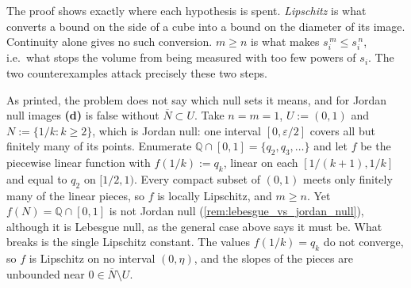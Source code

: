 \begin{exercisesolution}
\begin{ainote}
The proof shows exactly where each hypothesis is spent. \emph{Lipschitz} is what converts a bound
on the side of a cube into a bound on the diameter of its image. Continuity alone gives no
such conversion. \emph{$m \geq n$} is what makes $s_i^{\,m} \leq s_i^{\,n}$, i.e.\ what stops the
volume from being measured with too few powers of $s_i$. The two counterexamples attack precisely
these two steps.
\end{ainote}

\begin{ainote}
As printed, the problem does not say which null sets it means, and for Jordan null images
\textbf{(d)} is false without $\overline N \subset U$. Take $n = m = 1$, $U := (0,1)$ and
$N := \{1/k : k \geq 2\}$, which is Jordan null: one interval $[0,\varepsilon/2]$ covers all but
finitely many of its points. Enumerate $\mathbb{Q}\cap[0,1] = \{q_2, q_3, \dots\}$ and let $f$ be
the piecewise linear function with $f(1/k) := q_k$, linear on each $[1/(k+1), 1/k]$ and equal to
$q_2$ on $[1/2, 1)$. Every compact subset of $(0,1)$ meets only finitely many of the linear
pieces, so $f$ is locally Lipschitz, and $m \geq n$. Yet
$f(N) = \mathbb{Q}\cap[0,1]$ is not Jordan null (\cref{rem:lebesgue_vs_jordan_null}), although it
is Lebesgue null, as the general case above says it must be. What breaks is the single Lipschitz
constant. The values $f(1/k) = q_k$ do not converge, so $f$ is Lipschitz on no interval
$(0,\eta)$, and the slopes of the pieces are unbounded near $0 \in \overline N \setminus U$.
\end{ainote}
\end{exercisesolution}

